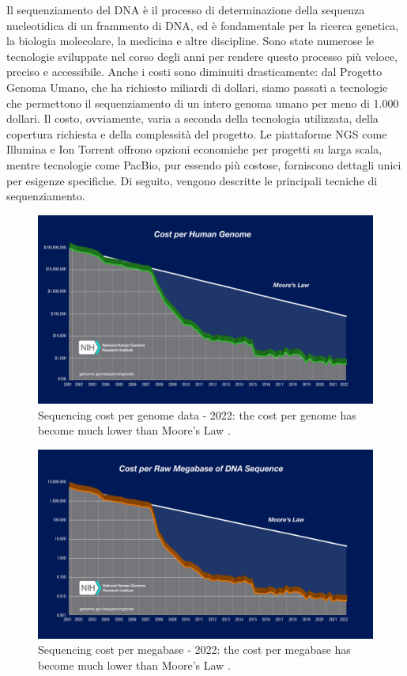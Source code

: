 Il sequenziamento del DNA è il processo di determinazione della sequenza nucleotidica di un frammento di DNA, ed è fondamentale per la ricerca genetica, la biologia molecolare, la medicina e altre discipline. Sono state numerose le tecnologie sviluppate nel corso degli anni per rendere questo processo più veloce, preciso e accessibile. Anche i costi sono diminuiti drasticamente: dal Progetto Genoma Umano, che ha richiesto miliardi di dollari, siamo passati a tecnologie che permettono il sequenziamento di un intero genoma umano per meno di 1.000 dollari. Il costo, ovviamente, varia a seconda della tecnologia utilizzata, della copertura richiesta e della complessità del progetto. Le piattaforme NGS come Illumina e Ion Torrent offrono opzioni economiche per progetti su larga scala, mentre tecnologie come PacBio, pur essendo più costose, forniscono dettagli unici per esigenze specifiche. Di seguito, vengono descritte le principali tecniche di sequenziamento.

\begin{figure}[!ht]
	\centering
	\includegraphics[width=0.85\linewidth]{images/2022_Sequencing_cost_per_Human_Genome}
	\caption{Sequencing cost per genome data - 2022: the cost per genome has become much lower than Moore’s Law \cite{cost_sequencing}.}
	\label{fig:sequencing-cost-per-human-genome}
\end{figure}

\begin{figure}[!ht]
	\centering
	\includegraphics[width=0.85\linewidth]{images/2022_Sequencing_cost_per_Mb}
	\caption{Sequencing cost per megabase - 2022: the cost per megabase has become much lower than Moore’s Law \cite{cost_sequencing}.}
	\label{fig:sequencing-cost-per-mb}
\end{figure}


